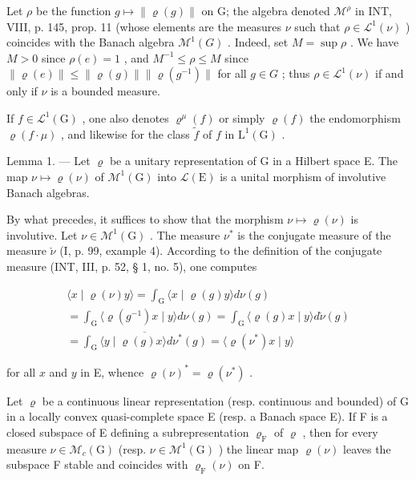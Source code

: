 Let \(\rho\) be the function \(g\mapsto\|\varrho(g)\|\) on G; the algebra denoted \(\mathcal{M}^{\rho}\) in INT, VIII, p. 145, prop. 11 (whose elements are the measures \(\nu\) such that \(\rho\in\mathcal{L}^{1}(\nu)\) ) coincides with the Banach algebra \(\mathcal{M}^{1}(G)\) . Indeed, set \(M = \sup \rho\) . We have \(M > 0\) since \(\rho(e)=1\) , and \(M^{-1} \leqslant \rho \leqslant M\) since \(\|\varrho(e)\|\leqslant\|\varrho(g)\|\|\varrho(g^{-1})\|\) for all \(g\in G\) ; thus \(\rho\in\mathcal{L}^{1}(\nu)\) if and only if \(\nu\) is a bounded measure.

If \(f \in \mathcal{L}^{1}(\mathrm{G})\) , one also denotes \(\varrho^{\mu}(f)\) or simply \(\varrho(f)\) the endomorphism \(\varrho(f \cdot \mu)\) , and likewise for the class \(\tilde{f}\) of \(f\) in \(\mathrm{L}^{1}(\mathrm{G})\) .

Lemma 1. --- Let \(\varrho\) be a unitary representation of G in a Hilbert space E. The map \(\nu \mapsto \varrho(\nu)\) of \(\mathcal{M}^{1}(\mathrm{G})\) into \(\mathcal{L}(\mathrm{E})\) is a unital morphism of involutive Banach algebras.

By what precedes, it suffices to show that the morphism \(\nu \mapsto \varrho(\nu)\) is involutive. Let \(\nu \in \mathcal{M}^{1}(\mathrm{G})\) . The measure \(\nu^{*}\) is the conjugate measure of the measure \(\check{\nu}\) (I, p. 99, example 4). According to the definition of the conjugate measure (INT, III, p. 52, § 1, no. 5), one computes

\[
\begin{array}{c} \langle x \mid \varrho (\nu) y \rangle = \int_ {\mathrm{G}} \langle x \mid \varrho (g) y \rangle d \nu (g) \\ = \int_ {\mathrm{G}} \langle \varrho (g ^ {- 1}) x \mid y \rangle d \nu (g) = \int_ {\mathrm{G}} \langle \varrho (g) x \mid y \rangle d \check {\nu} (g) \\ = \overline {{\int_ {\mathrm{G}} \langle y \mid \varrho (g) x \rangle d \nu^ {*} (g)}} = \langle \varrho (\nu^ {*}) x \mid y \rangle \end{array}
\]

for all \(x\) and \(y\) in E, whence \(\varrho(\nu)^{*} = \varrho(\nu^{*})\) .

Let \(\varrho\) be a continuous linear representation (resp. continuous and bounded) of G in a locally convex quasi-complete space E (resp. a Banach space E). If F is a closed subspace of E defining a subrepresentation \(\varrho_{\mathrm{F}}\) of \(\varrho\) , then for every measure \(\nu \in \mathcal{M}_c(\mathrm{G})\) (resp. \(\nu \in \mathcal{M}^1 (\mathrm{G})\) ) the linear map \(\varrho (\nu)\) leaves the subspace F stable and coincides with \(\varrho_{\mathrm{F}}(\nu)\) on F.

